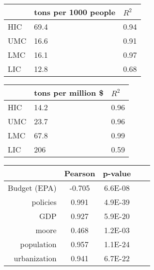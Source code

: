 \documentclass[10pt]{article} %
\begin{document}
\setlength{\tabcolsep}{0.33em} 
\flushleft

	\begin{tabular}{L{1cm} P{3.5cm} M{1.5cm}}
		\toprule
		    & tons per 1000 people
				& $R^2$    \\
	  \midrule
			HIC & 69.4 & 0.94  \\
			UMC & 16.6 & 0.91  \\
			LMC & 16.1 & 0.97  \\
			LIC & 12.8 & 0.68  \\
		\bottomrule
	\end{tabular}


\vspace{2\baselineskip}

\begin{tabular}{L{1cm} P{3.5cm} M{1.5cm}}
	\toprule
	    & tons per million \$
			& $R^2$    \\
	\midrule
		HIC & 14.2 & 0.96  \\
		UMC & 23.7 & 0.96  \\
		LMC & 67.8 & 0.99  \\
		LIC & 206 & 0.59	 \\
	\bottomrule
\end{tabular}

\vspace{2\baselineskip}

\begin{tabular}{rcccc}
	\toprule
		& Pearson & p-value \\
	\midrule
	Budget (EPA)   & -0.705   & 6.6E-08 \\
	policies     & 0.991   & 4.9E-39    \\
	GDP          & 0.927   & 5.9E-20    \\
	moore        & 0.468   & 1.2E-03    \\
	population   & 0.957   & 1.1E-24    \\
	urbanization & 0.941   & 6.7E-22    \\
	\bottomrule
\end{tabular}
\end{document}

